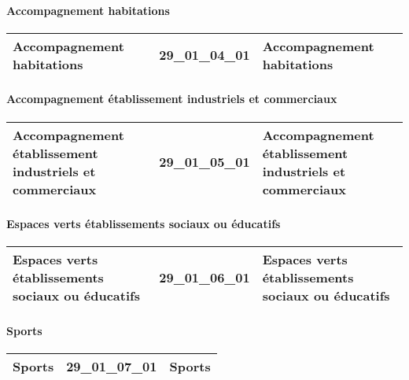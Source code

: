 \documentclass[12pt,titlepage]{book}
\begin{document}
\paragraph{Accompagnement habitations}
\noindent
\vspace{\baselineskip}

\renewcommand{\arraystretch}{1.2}
\begin{supertabular}{|p{10cm}|c|p{15cm}|}
 Accompagnement habitations & 29\_01\_04\_01 & Accompagnement habitations\\
\hline
\end{supertabular}


\paragraph{Accompagnement établissement industriels et commerciaux}
\noindent
\vspace{\baselineskip}

\renewcommand{\arraystretch}{1.2}
\begin{supertabular}{|p{10cm}|c|p{15cm}|}
 Accompagnement établissement industriels et commerciaux & 29\_01\_05\_01 & Accompagnement établissement industriels et commerciaux\\
\hline
\end{supertabular}


\paragraph{Espaces verts établissements sociaux ou éducatifs}
\noindent
\vspace{\baselineskip}

\renewcommand{\arraystretch}{1.2}
\begin{supertabular}{|p{10cm}|c|p{15cm}|}
 Espaces verts établissements sociaux ou éducatifs & 29\_01\_06\_01 & Espaces verts établissements sociaux ou éducatifs\\
\hline
\end{supertabular}


\paragraph{Sports}
\noindent
\vspace{\baselineskip}

\renewcommand{\arraystretch}{1.2}
\begin{supertabular}{|p{10cm}|c|p{15cm}|}
 Sports & 29\_01\_07\_01 & Sports\\
\hline
\end{supertabular}
\end{document}
